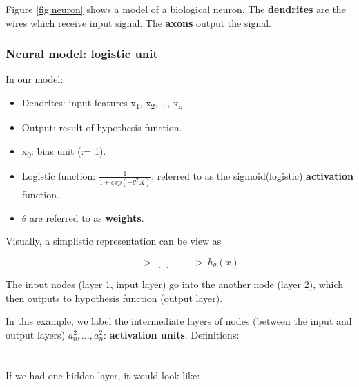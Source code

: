         Figure \ref{fig:neuron} shows a model of a biological neuron. The \textbf{dendrites} are the wires which receive input signal. The \textbf{axons} output the signal.

        \subsubsection{Neural model: logistic unit}
            In our model:
            \begin{itemize}
                \item Dendrites: input features x\textsubscript{1}, x\textsubscript{2}, \dots, x\textsubscript{n}.
                \item Output: result of hypothesis function.
                \item x\textsubscript{0}: bias unit (:= 1).
                \item Logistic function: $\frac{1}{1+exp(-\theta^T X)}$, referred to as the sigmoid(logistic) \textbf{activation} function.
                \item $\theta$ are referred to as \textbf{weights}.
            \end{itemize}

            Visually, a simplistic representation can be view as 

            \begin{equation}
                [x_0\; x_1\; x_2]\: --> \: [\:]\: -->\: h_\theta (x)
                \label{fig:visual-nn-repr}
            \end{equation}


            The input nodes (layer 1, input layer) go into the another node (layer 2), which then outputs to hypothesis function (output layer).

            In this example, we label the intermediate layers of nodes (between the input and output layers) $a^2_0, \dots, a^2_n$: \textbf{activation units}. 
            Definitions:\\

            \\

            \\
          
            If we had one hidden layer, it would look like:

